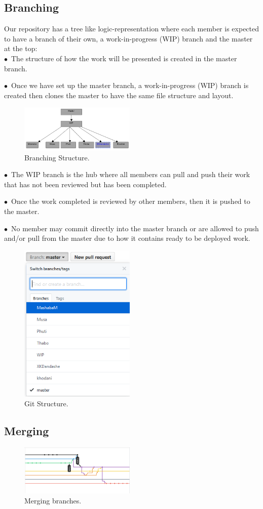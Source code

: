\documentclass[english]{article}
\begin{document}
\subsection{Branching}		
Our repository has a tree like logic-representation where each member is expected to have a branch of their own, a work-in-progress (WIP) branch and the master at the top:\\
$\bullet$\ The structure of how the work will be presented is created in the master branch.\par
$\bullet$\ Once we have set up the master branch, a work-in-progress (WIP) branch is created then clones the master to have the same file structure and layout.\par
\begin{figure}
	\caption{Branching Structure.}
	\label{wrap-fig:7}
	\includegraphics[width=5.5cm]{images/Branching.png}
\end{figure} 
$\bullet$\ The WIP branch is the hub where all members can pull and push their work that has not been reviewed but has been completed.\par
$\bullet$\ Once the work completed is reviewed by other members, then it is pushed to the master.\par
$\bullet$\ No member may commit directly into the master branch or are allowed to push and/or pull from the master due to how it contains ready to be deployed work.\par
\begin{figure}
	\caption{Git Structure.}
	\label{wrap-fig:8}
	\includegraphics[width=5.5cm]{images/GitStructure.png}
\end{figure} 


\subsection{Merging}
\begin{figure}
	\caption{Merging branches.}
	\label{wrap-fig:9}
	\includegraphics[width=5.5cm]{images/merging.png}
\end{figure} 

		
\end{document}
